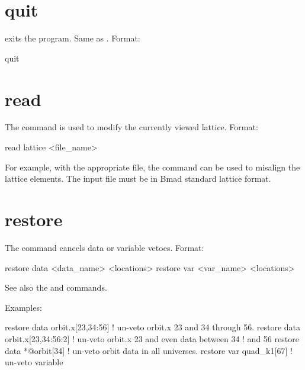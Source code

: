 \section{quit}
\label{s:quit}

 exits the program. Same as .
Format:
\begin{example}
  quit
\end{example}

\section{read}
\label{s:read}

The  command is used to modify the currently
viewed  lattice. Format:
\begin{example}
  read lattice <file_name>
\end{example}

\vskip 0.2in 
For example, with the appropriate file,
the  command can be used to misalign the lattice
elements. The input file must be in Bmad standard lattice format.

\section{restore}
\label{s:restore}

The  command cancels data or variable
vetoes. Format:
\begin{example}
  restore data  <data_name> <locations>
  restore var <var_name> <locations>
\end{example}

\vskip 0.2in 
See also the 
and  commands.

Examples:
\begin{example}
  restore data orbit.x[23,34:56]   ! un-veto orbit.x 23 and 34 through 56.
  restore data orbit.x[23,34:56:2] ! un-veto orbit.x 23 and even data between 34 
                                   !                                          and 56
  restore data *@orbit[34]         ! un-veto orbit data in all universes.
  restore var quad_k1[67]          ! un-veto variable
\end{example}

